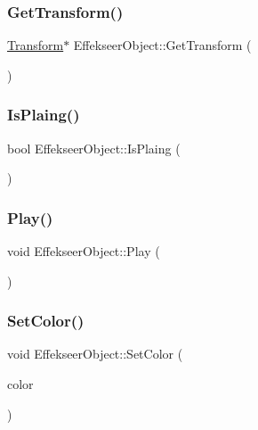 \subsubsection{\texorpdfstring{Get\+Transform()}{GetTransform()}}
{\footnotesize\ttfamily \mbox{\hyperlink{class_transform}{Transform}}$\ast$ Effekseer\+Object\+::\+Get\+Transform (\begin{DoxyParamCaption}{ }\end{DoxyParamCaption})\hspace{0.3cm}{\ttfamily [inline]}}

\mbox{\label{class_effekseer_object_a6fe253dd3387bdfd9305878ff194f305}} 
\subsubsection{\texorpdfstring{Is\+Plaing()}{IsPlaing()}}
{\footnotesize\ttfamily bool Effekseer\+Object\+::\+Is\+Plaing (\begin{DoxyParamCaption}{ }\end{DoxyParamCaption})\hspace{0.3cm}{\ttfamily [inline]}}

\mbox{\label{class_effekseer_object_a59c8a12b4eb558449622660d892b3cf4}} 
\subsubsection{\texorpdfstring{Play()}{Play()}}
{\footnotesize\ttfamily void Effekseer\+Object\+::\+Play (\begin{DoxyParamCaption}{ }\end{DoxyParamCaption})}

\mbox{\label{class_effekseer_object_a876c50dad7f959d77579b1ea274ea706}} 
\subsubsection{\texorpdfstring{Set\+Color()}{SetColor()}}
{\footnotesize\ttfamily void Effekseer\+Object\+::\+Set\+Color (\begin{DoxyParamCaption}\item[{\mbox{\hyperlink{_vector3_d_8h_a680c30c4a07d86fe763c7e01169cd6cc}{X\+Color4}}}]{color }\end{DoxyParamCaption})}

